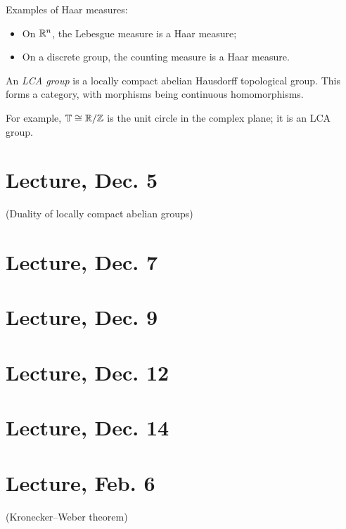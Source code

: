 \documentclass[11pt]{amsart}
\begin{document}
\begin{exm}
Examples of Haar measures:
\begin{itemize}
    \item On $\mathbb{R}^n$, the Lebesgue measure is a Haar measure;
    \item On a discrete group, the counting measure is a Haar measure.
\end{itemize}
\end{exm}

\begin{defn}
    An \emph{LCA group} is a locally compact abelian Hausdorff topological group. This forms a category, with morphisms being continuous homomorphisms.
\end{defn}

For example, $\mathbb{T} \cong \mathbb{R}/\mathbb{Z}$ is the unit circle in the complex plane; it is an LCA group.


\section{Lecture, Dec. 5}

(Duality of locally compact abelian groups)


\section{Lecture, Dec. 7}



\section{Lecture, Dec. 9}



\section{Lecture, Dec. 12}



\section{Lecture, Dec. 14}



\section{Lecture, Feb. 6}

(Kronecker--Weber theorem)
\end{document}
